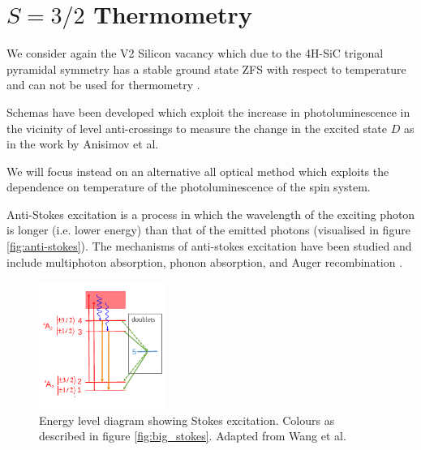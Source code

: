 \section{$S= 3/2$ Thermometry}\label{spin1.5-thermo}

We consider again the V2 Silicon vacancy which due to the 4H-SiC trigonal
pyramidal symmetry has a stable ground state ZFS with respect to temperature and can not be used for thermometry \cite{Castelletto_2024}.

Schemas have been developed which exploit the increase in photoluminescence in the vicinity of level anti-crossings to measure the change in the excited state $D$ as in the work by Anisimov et al.

We will focus instead on an alternative all optical method which exploits the dependence on temperature of the photoluminescence of the spin system.

Anti-Stokes excitation is a process in which the wavelength of the exciting photon is longer (i.e. lower energy) than that
of the emitted photons (visualised in figure \ref{fig:anti-stokes}).  The mechanisms of anti-stokes excitation have been studied and include multiphoton absorption, phonon absorption, and Auger recombination
\cite{Tran2019, Wang2019}.

\begin{figure}%
	\centering%
	\includegraphics[width=0.37\textwidth]{figures/actual-stokes.pdf}
    \caption{Energy level diagram showing Stokes excitation. Colours as described in figure \ref{fig:big_stokes}. Adapted from Wang et al.}
    \label{fig:stokes}
\end{figure}%



